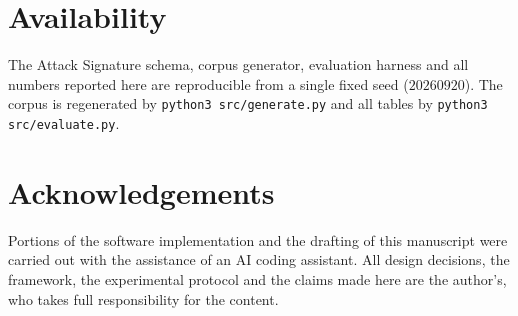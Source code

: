 \documentclass[11pt,a4paper]{article}
\begin{document}
\section*{Availability}
\label{sec:availability}

The Attack Signature schema, corpus generator, evaluation harness and all
numbers reported here are reproducible from a single fixed seed
($20260920$). The corpus is regenerated by \texttt{python3 src/generate.py} and
all tables by \texttt{python3 src/evaluate.py}.

\section*{Acknowledgements}

Portions of the software implementation and the drafting of this manuscript were
carried out with the assistance of an AI coding assistant. All design decisions,
the framework, the experimental protocol and the claims made here are the
author's, who takes full responsibility for the content.



\end{document}
